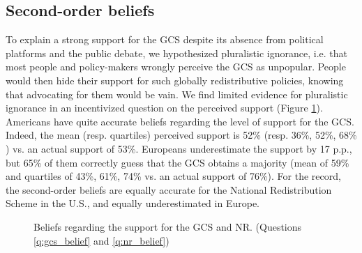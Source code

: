

\subsection{Second-order beliefs}
To explain a strong support for the GCS despite its absence from political platforms and the public debate, we hypothesized pluralistic ignorance, i.e. that most people and policy-makers wrongly perceive the GCS as unpopular. People would then hide their support for such globally redistributive policies, knowing that advocating for them would be vain. We find limited evidence for pluralistic ignorance in an incentivized question on the perceived support (Figure \ref{fig:belief}). Americans have quite accurate beliefs regarding the level of support for the GCS. Indeed, the mean (resp. quartiles) perceived support is 52\% (resp. 36\%, 52\%, 68\%%
) vs. an actual support of 53\%. Europeans underestimate the support by 17 p.p., but 65\% of them correctly guess that the GCS obtains a majority (mean of 59\% and quartiles of 43\%, 61\%, 74\% vs. an actual support of 76\%). For the record, the second-order beliefs are equally accurate for the National Redistribution Scheme in the U.S., and equally underestimated in Europe.%

\begin{figure}[h!]
    \caption[Beliefs about support for the GCS and NR]{Beliefs regarding the support for the GCS and NR. (Questions \ref{q:gcs_belief} and \ref{q:nr_belief})}\label{fig:belief}
\end{figure}

